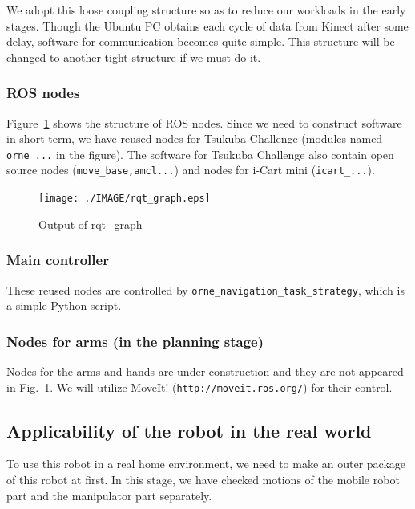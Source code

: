 \documentclass{llncs}
\begin{document}
We adopt this loose coupling structure
so as to reduce our workloads in the early stages.
Though the Ubuntu PC obtains each cycle of data from Kinect
after some delay, software for communication becomes
quite simple. This structure will be changed to
another tight structure if we must do it.



\subsubsection{ROS nodes}
Figure~\ref{fig:rqt_graph} shows the structure of ROS nodes.
Since we need to construct software in short term, 
we have reused nodes for Tsukuba Challenge (modules named
\texttt{orne\_...} in the figure).
The software for Tsukuba Challenge also contain open source nodes
(\texttt{move\_base,amcl...}) and nodes for i-Cart mini (\texttt{icart\_...}).

\begin{figure}[p]
	\begin{center}
		\texttt{[image: ./IMAGE/rqt\_graph.eps]}
		\caption{Output of rqt\_graph}
		\label{fig:rqt_graph}
	\end{center}
\end{figure}

\subsubsection{Main controller}
These reused nodes are controlled by
\texttt{orne\_navigation\_task\_strategy},
which is a simple Python script.

\subsubsection{Nodes for arms (in the planning stage)}
Nodes for the arms and hands are under construction and
they are not appeared in Fig.~\ref{fig:rqt_graph}.
We will utilize MoveIt! (\texttt{http://moveit.ros.org/})
for their control.

\subsection{Applicability of the robot in the real world}

To use this robot in a real home environment,
we need to make an outer package of this robot at first.
In this stage, we have checked motions of the mobile robot part
and the manipulator part separately.
\end{document}
